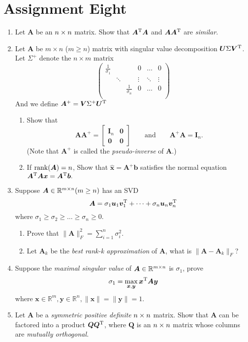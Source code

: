 \section{Assignment Eight}
\begin{enumerate}
\item
Let $\bm A$ be an $n\times n$ matrix. Show that $\bm A^{\mathrm T}\bm A$ and $\bm A\bm A^{\mathrm T}$ are \textit{similar}.
\item
Let $\bm A$ be $m\times n$ ($m\ge n$) matrix with singular value decomposition $\bm U\Sigma\bm V^{\mathrm T}$. Let $\Sigma^+$ denote the $n\times m$ matrix
\[
\begin{pmatrix}
\frac{1}{\sigma_1}&&&0&\dots&0\\
&\ddots&&\vdots&\ddots&\vdots\\
&&\frac{1}{\sigma_n}&0&\dots&0\\
\end{pmatrix}
\]
And we define $\bm A^+=\bm V\Sigma^+\bm U^{\mathrm T}$
\begin{enumerate}
\item
Show that
\[
\bm A\bm A^+=\begin{bmatrix}
\bm I_n&\bm0\\\bm0&\bm0
\end{bmatrix}\qquad\text{and}\qquad
\bm A^+\bm A=\bm I_n.
\]
(Note that $\bm A^+$ is called the \emph{pseudo-inverse} of $\bm A$.)
\item
If $\operatorname{rank}(\bm A)=n$, Show that $\hat{\bm x}=\bm A^+\bm b$ satisfies the normal equation $\bm A^{\mathrm T}\bm A\bm x=\bm A^{\mathrm T}\bm b.$
\end{enumerate}
\item
Suppose $\bm A\in\mathbb{R}^{m\times n}(m\ge n)$ has an SVD 
\[
\bm A=\sigma_1\bm u_1\bm v_1^{\mathrm T}+\dots+\sigma_n\bm u_n\bm v_n^{\mathrm T}
\]
where $\sigma_1\ge\sigma_2\ge\dots\ge\sigma_n\ge0.$
\begin{enumerate}
\item
Prove that $\|\bm A\|_{F}^2=\sum_{i=1}^{n}\sigma_i^2$.
\item
Let $\bm A_k$ be the \textit{best rank-k approximation} of $\bm A$, what is $\|\bm A-\bm A_k\|_{F}$?
\end{enumerate}
\item
Suppose the \textit{maximal singular value} of $\bm A\in\mathbb{R}^{m\times n}$ is $\sigma_1$, prove 
\[
\sigma_1=\max_{\bm x,\bm y}\bm x^{\mathrm T}\bm A\bm y
\]
where $\bm x\in\mathbb{R}^m,\bm y\in\mathbb{R}^n,\|\bm x\|=\|\bm y\|=1.$
\item
Let $\bm A$ be a \textit{symmetric positive definite} $n\times n$ matrix. Show that $\bm A$ can be factored into a product $\bm Q\bm Q^{\mathrm T}$, where $\bm Q$ is an $n\times n$ matrix whose columns are \textit{mutually orthogonal.}
\end{enumerate}